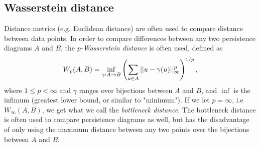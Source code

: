 \subsection{Wasserstein distance}
\label{sec:wasserstein-distance}
Distance metrics (e.g. Euclidean distance) are often used to compare distance between data points. In order to compare differences between any two persistence diagrams $A$ and $B$, the $p$\textit{-Wasserstein distance} is often used, defined as
\begin{align}
    W_p(A, B) = \inf_{\gamma: A \rightarrow B} \left(\sum\limits_{u \in A}^{} ||u - \gamma(u)||_{\infty}^{p}\right)^{1/p},
    \label{eqn:wasserstein-distance}
\end{align}
where $1 \leq p < \infty$ and $\gamma$ ranges over bijections between $A$ and $B$, and $\inf$ is the infimum (greatest lower bound, or similar to "minimum"). If we let $p=\infty$, i.e $W_\infty(A, B)$, we get what we call the \textit{bottleneck distance}. The bottleneck distance is often used to compare persistence diagrams as well, but has the disadvantage of only using the maximum distance between any two points over the bijections between $A$ and $B$.

